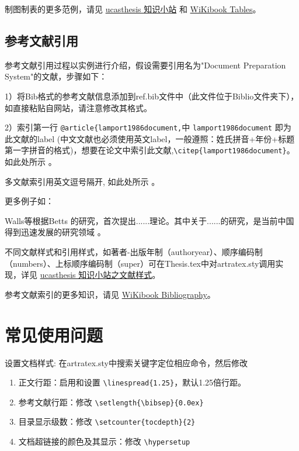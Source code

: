 {制图制表的更多范例，请见 \href{https://github.com/mohuangrui/ucasthesis/wiki}{ucasthesis 知识小站} 和 \href{https://en.wikibooks.org/wiki/LaTeX/Tables}{WiKibook Tables}。

\subsection{参考文献引用}

参考文献引用过程以实例进行介绍，假设需要引用名为"Document Preparation System"的文献，步骤如下：

1）将Bib格式的参考文献信息添加到ref.bib文件中（此文件位于Biblio文件夹下），如直接粘贴自网站，请注意修改其格式。

2）索引第一行 \verb|@article{lamport1986document,|中 \verb|lamport1986document| 即为此文献的label (中文文献也必须使用英文label，一般遵照：姓氏拼音+年份+标题第一字拼音的格式)，想要在论文中索引此文献,\verb|\citep{lamport1986document}|。如此处所示 \textsuperscript{\citep{lamport1986document}}。

多文献索引用英文逗号隔开, 如此处所示 \textsuperscript{\citep{lamport1986document, chu2004tushu, chen2005zhulu}}。

更多例子如：

Walls等\textsuperscript{\citep{walls2013drought}}根据Betts\textsuperscript{\citep{betts2005aging}} 的研究，首次提出......理论。其中关于......的研究\textsuperscript{}，是当前中国得到迅速发展的研究领域 \textsuperscript{\citep{chen1980zhongguo, bravo1990comparative}}。

不同文献样式和引用样式，如著者-出版年制（authoryear）、顺序编码制（numbers）、上标顺序编码制（super）可在Thesis.tex中对artratex.sty调用实现，详见 \href{https://github.com/mohuangrui/ucasthesis/wiki}{ucasthesis 知识小站之文献样式}。


参考文献索引的更多知识，请见 \href{https://en.wikibooks.org/wiki/LaTeX/Bibliography_Management}{WiKibook Bibliography}。\nocite{*}%

\section{常见使用问题}\label{sec:qa}

设置文档样式: 在artratex.sty中搜索关键字定位相应命令，然后修改
\begin{enumerate}
    \item 正文行距：启用和设置 \verb|\linespread{1.25}|，默认1.25倍行距。
    \item 参考文献行距：修改 \verb|\setlength{\bibsep}{0.0ex}|
    \item 目录显示级数：修改 \verb|\setcounter{tocdepth}{2}|
    \item 文档超链接的颜色及其显示：修改 \verb|\hypersetup|
\end{enumerate}

}
